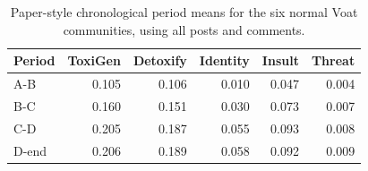 \begin{table}[htbp]
\centering
\small
\caption{Paper-style chronological period means for the six normal Voat communities, using all posts and comments.}
\label{tab:period-means}
\begin{tabular}{lrrrrr}
\toprule
Period & ToxiGen & Detoxify & Identity & Insult & Threat \\
\midrule
A-B & 0.105 & 0.106 & 0.010 & 0.047 & 0.004 \\
B-C & 0.160 & 0.151 & 0.030 & 0.073 & 0.007 \\
C-D & 0.205 & 0.187 & 0.055 & 0.093 & 0.008 \\
D-end & 0.206 & 0.189 & 0.058 & 0.092 & 0.009 \\
\bottomrule
\end{tabular}
\end{table}
